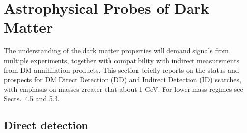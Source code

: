 \documentclass[../report.tex]{subfiles}
\begin{document}
\section{Astrophysical Probes of Dark Matter}


The understanding of the dark matter properties will demand signals from multiple experiments, together with compatibility with indirect measurements from DM annihilation products. This section  briefly reports on the status and prospects for DM Direct Detection (DD) and Indirect Detection (ID) searches, with emphasis on masses greater that about 1 GeV. For lower mass regimes see Sects.~4.5 and 5.3.

\subsection{Direct detection}
\end{document}
